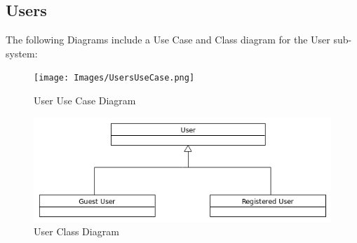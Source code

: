 \documentclass{article}
\begin{document}
	\subsection{Users}
	The following Diagrams include a Use Case and Class diagram for the User sub-system:	
	\FloatBarrier	
	\begin{figure}[h]
		\caption{User Use Case Diagram}
		\centering
  		\texttt{[image: Images/UsersUseCase.png]}
	\end{figure}
	\begin{figure}[h]
	\caption{User Class Diagram}
	\centering
  		\includegraphics[width=\textwidth]{Images/UserClass.png}
	\end{figure}
	\FloatBarrier
\end{document}
